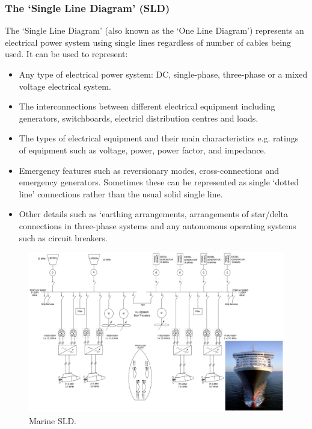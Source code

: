 \documentclass[class=report, crop=false, 12pt,a4paper]{standalone}
\begin{document}
\subsubsection{The `Single Line Diagram' (SLD)}
The `Single Line Diagram' (also known as the `One Line Diagram') represents an electrical power system using single lines regardless of number of cables being used. It can be used to represent:
\begin{itemize}
	\item Any type of electrical power system: DC, single-phase, three-phase or a mixed voltage electrical system.
	\item The interconnections between different electrical equipment including generators, switchboards, electricl distribution centres and loads.
	\item The types of electrical equipment and their main characteristics e.g. ratings of equipment such as voltage, power, power factor, and impedance.
	\item Emergency features such as reversionary modes, cross-connections and emergency generators. Sometimes these can be represented as single `dotted line' connections rather than the usual solid single line.
	\item Other details such as `earthing arrangements, arrangements of star/delta connections in three-phase systems and any autonomous operating systems such as circuit breakers.
\end{itemize}
\begin{figure}[H]
	\centering
	\includegraphics[width = \textwidth]{../img/figure4.png}
	\caption{Marine SLD.}
\end{figure}
\end{document}
